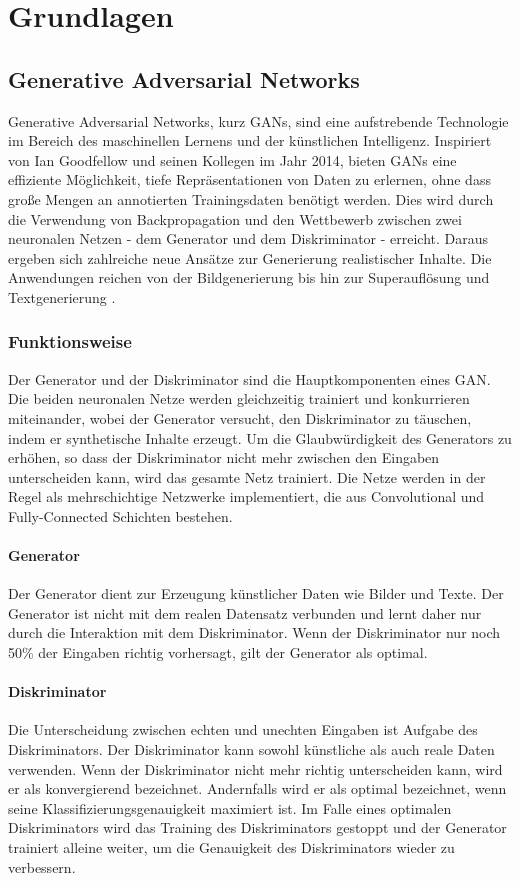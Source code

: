 \chapter{Grundlagen}

\section{Generative Adversarial Networks}
Generative Adversarial Networks, kurz GANs, sind eine aufstrebende Technologie im Bereich des maschinellen Lernens und der künstlichen Intelligenz. Inspiriert von Ian Goodfellow und seinen Kollegen im Jahr 2014, bieten GANs eine effiziente Möglichkeit, tiefe Repräsentationen von Daten zu erlernen, ohne dass große Mengen an annotierten Trainingsdaten benötigt werden\cite{Creswell.2018}. 
Dies wird durch die Verwendung von Backpropagation und den Wettbewerb zwischen zwei neuronalen Netzen - dem Generator und dem Diskriminator - erreicht. 
Daraus ergeben sich zahlreiche neue Ansätze zur Generierung realistischer Inhalte. 
Die Anwendungen reichen von der Bildgenerierung bis hin zur Superauflösung und Textgenerierung \cite{Aggarwal.2021}.

\subsection{Funktionsweise}
Der Generator und der Diskriminator sind die Hauptkomponenten eines GAN. Die beiden neuronalen Netze werden gleichzeitig trainiert und konkurrieren miteinander, wobei der Generator versucht, den Diskriminator zu täuschen, indem er synthetische Inhalte erzeugt. Um die Glaubwürdigkeit des Generators zu erhöhen, so dass der Diskriminator nicht mehr zwischen den Eingaben unterscheiden kann, wird das gesamte Netz trainiert. Die Netze werden in der Regel als mehrschichtige Netzwerke implementiert, die aus Convolutional und Fully-Connected Schichten bestehen\cite{Creswell.2018}.

\subsubsection*{Generator}
Der Generator dient zur Erzeugung künstlicher Daten wie Bilder und Texte. 
Der Generator ist nicht mit dem realen Datensatz verbunden und lernt daher nur durch die Interaktion mit dem Diskriminator. Wenn der Diskriminator nur noch 50\% der Eingaben richtig vorhersagt, gilt der Generator als optimal\cite{Creswell.2018}.

\subsubsection*{Diskriminator}
Die Unterscheidung zwischen echten und unechten Eingaben ist Aufgabe des Diskriminators. Der Diskriminator kann sowohl künstliche als auch reale Daten verwenden. 
Wenn der Diskriminator nicht mehr richtig unterscheiden kann, wird er als konvergierend bezeichnet\cite{Aggarwal.2021}. Andernfalls wird er als optimal bezeichnet, wenn seine Klassifizierungsgenauigkeit maximiert ist. Im Falle eines optimalen Diskriminators wird das Training des Diskriminators gestoppt und der Generator trainiert alleine weiter, um die Genauigkeit des Diskriminators wieder zu verbessern\cite{Creswell.2018}.

